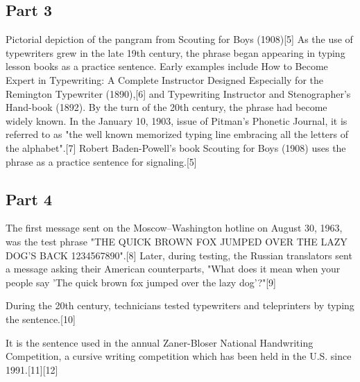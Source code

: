 \documentclass[12pt, letterpaper]{article}
\begin{document}
\subsection{Part 3}
Pictorial depiction of the pangram from Scouting for Boys (1908)[5]
As the use of typewriters grew in the late 19th century, the phrase began appearing in typing lesson books as a practice sentence. Early examples include How to Become Expert in Typewriting: A Complete Instructor Designed Especially for the Remington Typewriter (1890),[6] and Typewriting Instructor and Stenographer's Hand-book (1892). By the turn of the 20th century, the phrase had become widely known. In the January 10, 1903, issue of Pitman's Phonetic Journal, it is referred to as "the well known memorized typing line embracing all the letters of the alphabet".[7] Robert Baden-Powell's book Scouting for Boys (1908) uses the phrase as a practice sentence for signaling.[5]

\subsection{Part 4}
The first message sent on the Moscow–Washington hotline on August 30, 1963, was the test phrase "THE QUICK BROWN FOX JUMPED OVER THE LAZY DOG'S BACK 1234567890".[8] Later, during testing, the Russian translators sent a message asking their American counterparts, "What does it mean when your people say 'The quick brown fox jumped over the lazy dog'?"[9]

During the 20th century, technicians tested typewriters and teleprinters by typing the sentence.[10]

It is the sentence used in the annual Zaner-Bloser National Handwriting Competition, a cursive writing competition which has been held in the U.S. since 1991.[11][12]
\end{document}
